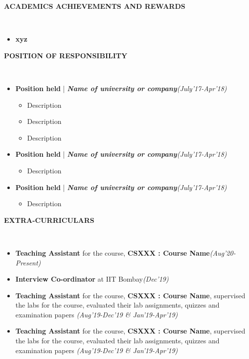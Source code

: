 \documentclass[a4paper,10pt]{article}
\newcommand{\resheading}[1]{{\small \colorbox{mygrey}{\begin{minipage}{0.99\textwidth}{\textbf{#1 \vphantom{p\^{E}}}}\end{minipage}}}}
\begin{document}
\noindent
\resheading{\textbf{ACADEMICS ACHIEVEMENTS AND REWARDS}}\\[-0.3cm]
\begin{itemize}[noitemsep,nolistsep]
 \item \textbf{xyz}
\end{itemize}

\noindent
\resheading{\textbf{POSITION OF RESPONSIBILITY}}\\[-0.4cm]
\begin{itemize}
    \item \textbf{Position held} | \textbf{\emph{Name of university or company}}\hfill \emph{(July’17-Apr'18)}\\[-0.6cm]
    \begin{itemize}[noitemsep]
        \item Description
        \item Description
        \item Description\\[-0.5cm]
    \end{itemize}
    \item \textbf{Position held} | \textbf{\emph{Name of university or company}}\hfill \emph{(July’17-Apr'18)}\\[-0.6cm]
    \begin{itemize}[noitemsep]
        \item Description\\[-0.5cm]
    \end{itemize}
    \item \textbf{Position held} | \textbf{\emph{Name of university or company}}\hfill \emph{(July’17-Apr'18)}\\[-0.6cm]
    \begin{itemize}[noitemsep]
        \item Description\\[-0.5cm]
    \end{itemize}

\end{itemize}

\noindent
\resheading{\textbf{EXTRA-CURRICULARS}}\\[-0.4cm]
\begin{itemize}
\setlength\itemsep{-0.4em}
\item \textbf{Teaching Assistant} for the course, \textbf{CSXXX : Course Name}\hfill \emph{(Aug'20-Present)}

\item \textbf{Interview Co-ordinator} at IIT Bombay\hfill \emph{(Dec'19)}

\item \textbf{Teaching Assistant} for the course, \textbf{CSXXX : Course Name}, supervised the labs for the course, evaluated their lab assignments, quizzes and examination papers \hfill \emph{(Aug'19-Dec'19 \& Jan'19-Apr'19)}

 \item \textbf{Teaching Assistant} for the course, \textbf{CSXXX : Course Name}, supervised the labs for the course, evaluated their lab assignments, quizzes and examination papers \hfill \emph{(Aug'19-Dec'19 \& Jan'19-Apr'19)}

\end{itemize}
\end{document}
